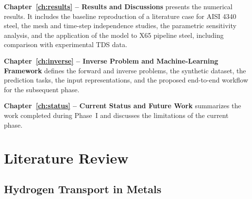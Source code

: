 \documentclass[a4paper,12pt,oneside]{report}
\begin{document}
\textbf{Chapter~\ref{ch:results} -- Results and Discussions} presents the numerical results. It includes the baseline reproduction of a literature case for AISI 4340 steel, the mesh and time-step independence studies, the parametric sensitivity analysis, and the application of the model to X65 pipeline steel, including comparison with experimental TDS data.

\textbf{Chapter~\ref{ch:inverse} -- Inverse Problem and Machine-Learning Framework} defines the forward and inverse problems, the synthetic dataset, the prediction tasks, the input representations, and the proposed end-to-end workflow for the subsequent phase.

\textbf{Chapter~\ref{ch:status} -- Current Status and Future Work} summarizes the work completed during Phase~I and discusses the limitations of the current phase.


\chapter{Literature Review}
\label{chap:literature_review}

\section{Hydrogen Transport in Metals}
\label{sec:hydrogen_transport}
\end{document}

